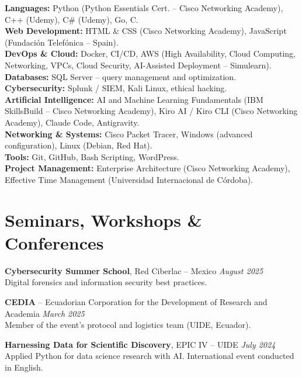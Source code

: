 \documentclass[10.5pt]{article}
\begin{document}
\textbf{Languages:} Python (Python Essentials Cert. -- Cisco Networking Academy), C++ (Udemy), C\# (Udemy), Go, C.\\
\textbf{Web Development:} HTML \& CSS (Cisco Networking Academy), JavaScript (Fundación Telefónica -- Spain).\\
\textbf{DevOps \& Cloud:} Docker, CI/CD, AWS (High Availability, Cloud Computing, Networking, VPCs, Cloud Security, AI-Assisted Deployment -- Simulearn).\\
\textbf{Databases:} SQL Server -- query management and optimization.\\
\textbf{Cybersecurity:} Splunk / SIEM, Kali Linux, ethical hacking.\\
\textbf{Artificial Intelligence:} AI and Machine Learning Fundamentals (IBM SkillsBuild -- Cisco Networking Academy), Kiro AI / Kiro CLI (Cisco Networking Academy), Claude Code, Antigravity.\\
\textbf{Networking \& Systems:} Cisco Packet Tracer, Windows (advanced configuration), Linux (Debian, Red Hat).\\
\textbf{Tools:} Git, GitHub, Bash Scripting, WordPress.\\
\textbf{Project Management:} Enterprise Architecture (Cisco Networking Academy), Effective Time Management (Universidad Internacional de Córdoba).

\section*{Seminars, Workshops \& Conferences}
\textbf{Cybersecurity Summer School}, Red Ciberlac -- Mexico \hfill \textit{August 2025}\\
Digital forensics and information security best practices.

\vspace{0.2em}
\textbf{CEDIA} -- Ecuadorian Corporation for the Development of Research and Academia \hfill \textit{March 2025}\\
Member of the event's protocol and logistics team (UIDE, Ecuador).

\vspace{0.2em}
\textbf{Harnessing Data for Scientific Discovery}, EPIC IV -- UIDE \hfill \textit{July 2024}\\
Applied Python for data science research with AI. International event conducted in English.
\end{document}
